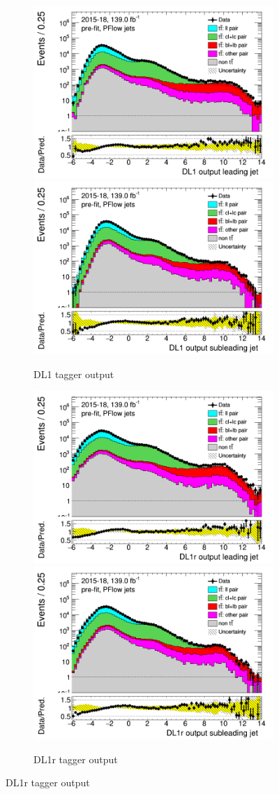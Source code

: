 \begin{figure}[H]
	\begin{subfigure}[t]{1\linewidth}
	\includegraphics[width=.45\textwidth]{FTAG_plots/pretagNoRwwithhighpTPFlowall/DataMC_h_J0_DL1_log.png}
	\includegraphics[width=.45\textwidth]{FTAG_plots/pretagNoRwwithhighpTPFlowall/DataMC_h_J1_DL1_log.png}\\
	\caption{DL1 tagger output}
	\end{subfigure}
	\begin{subfigure}[t]{1\linewidth}
		\includegraphics[width=.45\textwidth]{FTAG_plots/pretagNoRwwithhighpTPFlowall/DataMC_h_J0_DL1r_log.png}
		\includegraphics[width=.45\textwidth]{FTAG_plots/pretagNoRwwithhighpTPFlowall/DataMC_h_J1_DL1r_log.png}\\
		\caption{DL1r tagger output}

\end{subfigure}
\end{figure}
